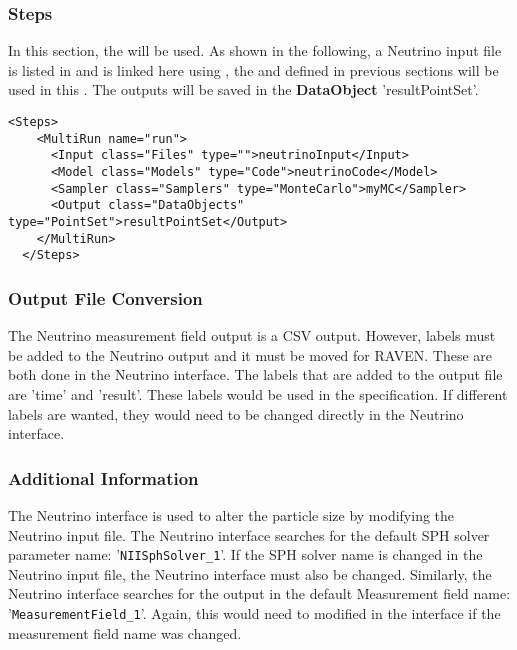 \subsubsection{Steps}
In this section, the  will be used. As shown in the following, a Neutrino
input file is listed in  and is linked here using , the 
and  defined in previous sections will be used in this . The
outputs will be saved in the \textbf{DataObject} 'resultPointSet'.

\begin{lstlisting}[style=XML]
  <Steps>
    <MultiRun name="run">
      <Input class="Files" type="">neutrinoInput</Input>
      <Model class="Models" type="Code">neutrinoCode</Model>
      <Sampler class="Samplers" type="MonteCarlo">myMC</Sampler>
      <Output class="DataObjects" type="PointSet">resultPointSet</Output>
    </MultiRun>
  </Steps>
\end{lstlisting}

\subsubsection{Output File Conversion}
The Neutrino measurement field output is a CSV output. However, labels must be added to the Neutrino output
and it must be moved for RAVEN. These are both done in the Neutrino interface. The labels that are added to the
output file are 'time' and 'result'. These labels would be used in the  specification.
If different labels are wanted, they would need to be changed directly in the Neutrino interface.

\subsubsection{Additional Information}
The Neutrino interface is used to alter the particle size by modifying the Neutrino input file. The Neutrino interface
searches for the default SPH solver parameter name: '\texttt{NIISphSolver\_1}'. If the SPH solver name is changed in the
Neutrino input file, the Neutrino interface must also be changed. Similarly, the Neutrino interface searches for the
output in the default Measurement field name: '\texttt{MeasurementField\_1}'. Again, this would need to modified in the interface
if the measurement field name was changed.

